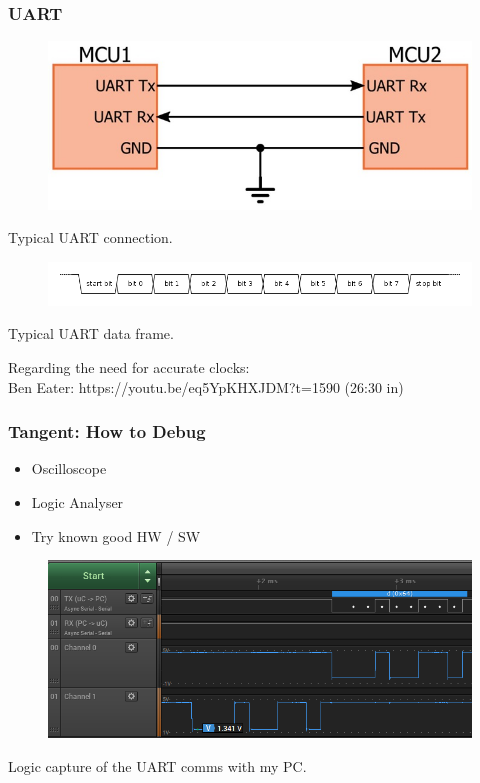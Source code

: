 \documentclass[t]{beamer}
\begin{document}

\begin{frame}[t]
\frametitle{UART}
\begin{figure}
	\includegraphics[width=0.5\linewidth]{uartConfig.jpg}
\end{figure}
\begin{center}
	Typical UART connection.
\end{center}
\begin{figure}
	\includegraphics[width=0.9\linewidth]{uartFrame.png}
\end{figure}
\begin{center}
	Typical UART data frame.
\end{center}

\vspace{3mm}
Regarding the need for accurate clocks:\\
Ben Eater: https://youtu.be/eq5YpKHXJDM?t=1590 (26:30 in)
\end{frame}


\begin{frame}[t]
\frametitle{Tangent: How to Debug}
\begin{itemize}
	\item Oscilloscope
	\item Logic Analyser
	\item Try known good HW / SW
\end{itemize}
\begin{figure}
	\includegraphics[width=0.9\linewidth]{serialNotWorking.png}
\end{figure}
Logic capture of the UART comms with my PC.
\end{frame}
\end{document}
